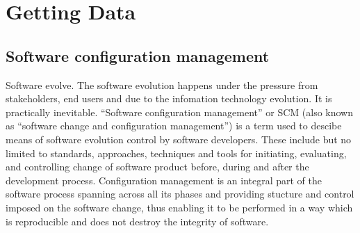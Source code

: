 \chapter{Getting Data}

\section{Software configuration management}
Software evolve. The software evolution happens under the pressure from stakeholders, end users and due to the infomation technology evolution. It is practically inevitable.
``Software configuration management'' or SCM (also known as ``software change and configuration management'') is a term used to descibe means of software evolution control by
software developers. These include but no limited to standards, approaches, techniques and tools for initiating, evaluating, and controlling change of software product before,
during and after the development process. Configuration management is an integral part of the software process spanning across all its phases and providing stucture and control
imposed on the software change, thus enabling it to be performed in a way which is reproducible and does not destroy the integrity of software.


